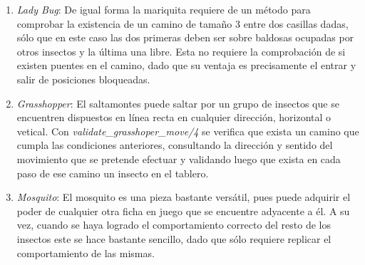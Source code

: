 \documentclass[runningheads,a4paper]{llncs}
\begin{document}
\begin{enumerate}
	\item \emph{Lady Bug}: De igual forma la mariquita requiere de un m\'etodo para comprobar la existencia de un camino de tama\~no 3 entre dos casillas dadas, s\'olo que en este caso las dos primeras deben ser sobre baldosas ocupadas por otros insectos y la \'ultima una libre. Esta no requiere la comprobaci\'on de si existen puentes en el camino, dado que su ventaja es precisamente el entrar y salir de posiciones bloqueadas.
	
	\item \emph{Grasshopper}: El saltamontes puede saltar por un grupo de insectos que se encuentren dispuestos en l\'inea recta en cualquier direcci\'on, horizontal o vetical. Con \emph{validate\_grasshoper\_move/4} se verifica que exista un camino que cumpla las condiciones anteriores, consultando la direcci\'on y sentido del movimiento que se pretende efectuar y validando luego que exista en cada paso de ese camino un insecto en el tablero.
	
	\item \emph{Mosquito}: El mosquito es una pieza bastante vers\'atil, pues puede adquirir el poder de cualquier otra ficha en juego que se encuentre adyacente a \'el. A su vez, cuando se haya logrado el comportamiento correcto del resto de los insectos este se hace bastante sencillo, dado que s\'olo requiere replicar el comportamiento de las mismas.
	
\end{enumerate}
\end{document}

